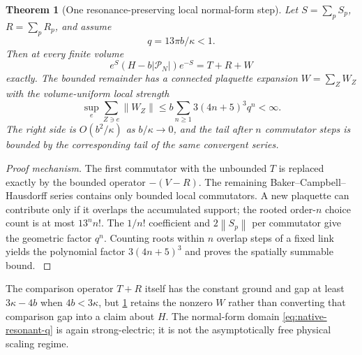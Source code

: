 \documentclass[11pt,oneside,openany]{book}
\newtheorem{theorem}{Theorem}[chapter]
\theoremstyle{definition}
\theoremstyle{remark}
\newcommand{\norm}[1]{\left\lVert#1\right\rVert}
\newcommand{\src}[2]{\cite[#2]{#1}}
\begin{document}
\begin{theorem}[One resonance-preserving local normal-form step]
\label{thm:native-resonant-normal-form}
Let $S=\sum_pS_p$, $R=\sum_pR_p$, and assume
\begin{equation}\label{eq:native-resonant-q}
 q=13\pi b/\kappa<1.
\end{equation}
Then at every finite volume
\begin{equation}\label{eq:native-resonant-normal-form}
 e^S(H-b|\mathcal P_N|)e^{-S}=T+R+W
\end{equation}
exactly.  The bounded remainder has a connected plaquette expansion
$W=\sum_ZW_Z$ with the volume-uniform local strength
\begin{equation}\label{eq:native-resonant-local-remainder}
 \sup_e\sum_{Z\ni e}\norm{W_Z}
 \le b\sum_{n\ge1}3(4n+5)^3q^n<\infty.
\end{equation}
The right side is $O(b^2/\kappa)$ as $b/\kappa\to0$, and the tail after
$n$ commutator steps is bounded by the corresponding tail of the same
convergent series.
\end{theorem}
\begin{proof}[Proof mechanism]
The first commutator with the unbounded $T$ is replaced exactly by the
bounded operator $-(V-R)$.  The remaining Baker--Campbell--Hausdorff
series contains only bounded local commutators.  A new plaquette can
contribute only if it overlaps the accumulated support; the rooted
order-$n$ choice count is at most $13^nn!$.  The $1/n!$ coefficient and
$2\norm{S_p}$ per commutator give the geometric factor $q^n$.
Counting roots within $n$ overlap steps of a fixed link yields the
polynomial factor $3(4n+5)^3$ and proves the spatially summable bound.
\src{F17}{V100}
\end{proof}

The comparison operator $T+R$ itself has the constant ground and gap at
least $3\kappa-4b$ when $4b<3\kappa$, but
\cref{thm:native-resonant-normal-form} retains the nonzero $W$ rather
than converting that comparison gap into a claim about $H$.  The
normal-form domain \cref{eq:native-resonant-q} is again strong-electric;
it is not the asymptotically free physical scaling regime.
\end{document}
